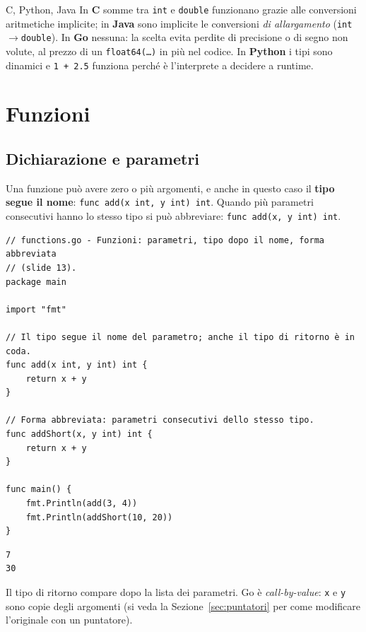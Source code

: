 \documentclass[11pt,a4paper]{report}
\newcommand{\cod}[1]{\texttt{#1}}
\begin{document}
\begin{confronto}{C, Python, Java}
In \textbf{C} somme tra \cod{int} e \cod{double} funzionano grazie alle
conversioni aritmetiche implicite; in \textbf{Java} sono implicite le conversioni
\emph{di allargamento} (\cod{int}$\to$\cod{double}). In \textbf{Go} nessuna: la
scelta evita perdite di precisione o di segno non volute, al prezzo di un
\cod{float64(\ldots)} in più nel codice. In \textbf{Python} i tipi sono dinamici e
\cod{1 + 2.5} funziona perché è l'interprete a decidere a runtime.
\end{confronto}

\chapter{Funzioni}\label{ch:funzioni}

\section{Dichiarazione e parametri}

Una funzione può avere zero o più argomenti, e anche in questo caso il
\textbf{tipo segue il nome}: \cod{func add(x int, y int) int}. Quando più
parametri consecutivi hanno lo stesso tipo si può abbreviare:
\cod{func add(x, y int) int}.

\begin{lstlisting}[style=gocode,caption={\texttt{02\_functions/functions.go}}]
// functions.go - Funzioni: parametri, tipo dopo il nome, forma abbreviata
// (slide 13).
package main

import "fmt"

// Il tipo segue il nome del parametro; anche il tipo di ritorno è in coda.
func add(x int, y int) int {
	return x + y
}

// Forma abbreviata: parametri consecutivi dello stesso tipo.
func addShort(x, y int) int {
	return x + y
}

func main() {
	fmt.Println(add(3, 4))
	fmt.Println(addShort(10, 20))
}
\end{lstlisting}
\begin{lstlisting}[style=output]
7
30
\end{lstlisting}

Il tipo di ritorno compare dopo la lista dei parametri. Go è
\emph{call-by-value}: \cod{x} e \cod{y} sono copie degli argomenti (si veda la
Sezione~\ref{sec:puntatori} per come modificare l'originale con un puntatore).
\end{document}
